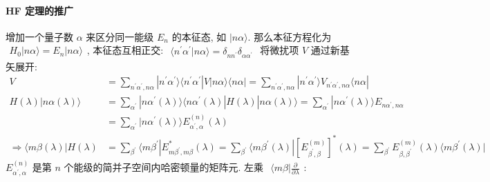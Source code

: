 \documentclass[../../main.tex]{subfiles}
\begin{document}
\paragraph{HF 定理的推广}
增加一个量子数 $\alpha$ 来区分同一能级 $E_{n}$ 的本征态, 如 $|n\alpha\rangle$. 那么本征方程化为 $\begin{aligned}
    H_{0}|n\alpha\rangle = E_{n}|n\alpha\rangle
\end{aligned}$, 本征态互相正交: $\begin{aligned}
    \langle n^{\prime}\alpha^{\prime}|n\alpha\rangle = \delta_{nn^{\prime}}\delta_{\alpha\alpha^{\prime}}
\end{aligned}$
将微扰项 $V$ 通过新基矢展开: 
\begin{align*}
    V &= \sum_{n^{\prime}\alpha^{\prime},n\alpha}|n^{\prime}\alpha^{\prime}\rangle \langle n^{\prime}\alpha^{\prime}|V|n\alpha\rangle \langle n\alpha| = \sum_{n^{\prime}\alpha^{\prime},n\alpha}|n^{\prime}\alpha^{\prime}\rangle V_{n^{\prime}\alpha^{\prime},n\alpha}\langle n\alpha|\\
    H(\lambda)|n\alpha(\lambda)\rangle &= \sum_{\alpha^{\prime}}|n\alpha^{\prime}(\lambda)\rangle\langle n\alpha^{\prime}(\lambda)|H(\lambda)|n\alpha(\lambda)\rangle = \sum_{\alpha^{\prime}}|n\alpha^{\prime}(\lambda)\rangle E_{n\alpha^{\prime},n\alpha}\\
    &= \sum_{\alpha^{\prime}}|n\alpha^{\prime}(\lambda)\rangle E^{(n)}_{\alpha^{\prime},\alpha}(\lambda)\\
    \Rightarrow \langle m\beta(\lambda)|H(\lambda) &= \sum_{\beta^{\prime}}\langle m\beta^{\prime}|E^{*}_{m\beta^{\prime},m\beta}(\lambda) 
    = \sum_{\beta^{\prime}}\langle m\beta^{\prime}(\lambda)|[E^{(m)}_{\beta^{\prime},\beta}]^{*}(\lambda)
    = \sum_{\beta^{\prime}}E^{(m)}_{\beta,\beta^{\prime}}(\lambda)\langle m\beta^{\prime}(\lambda)|
\end{align*}
$E^{(n)}_{\alpha^{\prime},\alpha}$ 是第 $n$ 个能级的简并子空间内哈密顿量的矩阵元. 左乘 $\begin{aligned}
    \langle m\beta|\frac{\partial}{\partial\lambda}
\end{aligned}$: 
\end{document}
